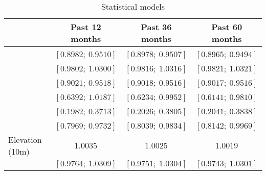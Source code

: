 
\begin{table}
\caption{Statistical models}
\begin{center}
\begin{tabular}{l c c c }
\hline
                                          & Past 12 months & Past 36 months & Past 60 months \\
\hline
\\%
                                          & $[0.8982;\ 0.9510]$ & $[0.8978;\ 0.9507]$ & $[0.8965;\ 0.9494]$ \\
\\%
                                          & $[0.9802;\ 1.0300]$ & $[0.9816;\ 1.0316]$ & $[0.9821;\ 1.0321]$ \\
\\%
                                          & $[0.9021;\ 0.9518]$ & $[0.9018;\ 0.9516]$ & $[0.9017;\ 0.9516]$ \\
\\%
                                          & $[0.6392;\ 1.0187]$ & $[0.6234;\ 0.9952]$ & $[0.6141;\ 0.9810]$ \\
\\%
                                          & $[0.1982;\ 0.3713]$ & $[0.2026;\ 0.3805]$ & $[0.2041;\ 0.3838]$ \\
\\%
                                          & $[0.7969;\ 0.9732]$ & $[0.8039;\ 0.9834]$ & $[0.8142;\ 0.9969]$ \\
Elevation (10m)                           & $1.0035$            & $1.0025$            & $1.0019$            \\
                                          & $[0.9764;\ 1.0309]$ & $[0.9751;\ 1.0304]$ & $[0.9743;\ 1.0301]$ \\

\end{tabular}
\end{center}
\end{table}
